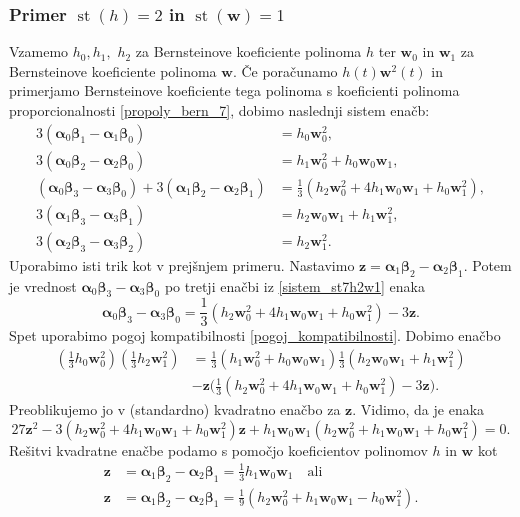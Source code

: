 \documentclass[12pt,a4paper,twoside]{article}
\theoremstyle{definition} %
\theoremstyle{plain} %
\theoremstyle{primerstyle}
\numberwithin{equation}{section}  %
\newcommand{\wV}{\mathbf{w}}
\newcommand{\zV}{\mathbf{z}}
\newcommand{\balpha}{\boldsymbol \alpha}
\newcommand{\bbeta}{\boldsymbol \beta}
\DeclareMathOperator{\st}{st}
\begin{document}
\subsubsection{Primer \texorpdfstring{$\st(h)=2$}{st(h)=2} in \texorpdfstring{$\st(\wV)=1$}{st(w)=1}}
\label{klasifikacija_h2w1}

Vzamemo $h_0,h_1,$ $h_2$ za Bernsteinove koeficiente polinoma $h$ ter $\wV_0$ in $\wV_1$ za Bernsteinove koeficiente polinoma $\wV.$ Če poračunamo $h(t)\wV^2(t)$ in primerjamo Bernsteinove koeficiente tega polinoma s koeficienti polinoma proporcionalnosti \eqref{propoly_bern_7}, dobimo naslednji sistem enačb:
\begin{align}
	3(\balpha_0\bbeta_1-\balpha_1\bbeta_0)&=h_0\wV_0^2,\nonumber\\
	3(\balpha_0\bbeta_2-\balpha_2\bbeta_0)&=h_1\wV_0^2+h_0\wV_0\wV_1,\nonumber\\
	(\balpha_0\bbeta_3-\balpha_3\bbeta_0)+3(\balpha_1\bbeta_2-\balpha_2\bbeta_1)&=\frac{1}{3}(h_2\wV_0^2+4h_1\wV_0\wV_1+h_0\wV_1^2),\label{sistem_st7h2w1}\\
	3(\balpha_1\bbeta_3-\balpha_3\bbeta_1)&=h_2\wV_0\wV_1+h_1\wV_1^2,\nonumber\\
	3(\balpha_2\bbeta_3-\balpha_3\bbeta_2)&=h_2\wV_1^2.\nonumber
\end{align}
Uporabimo isti trik kot v prejšnjem primeru. Nastavimo $\zV=\balpha_1\bbeta_2-\balpha_2\bbeta_1.$ Potem je vrednost $\balpha_0\bbeta_3-\balpha_3\bbeta_0$ po tretji enačbi iz \eqref{sistem_st7h2w1} enaka $$\balpha_0\bbeta_3-\balpha_3\bbeta_0=\frac{1}{3}(h_2\wV_0^2+4h_1\wV_0\wV_1+h_0\wV_1^2)-3\zV.$$ Spet uporabimo pogoj kompatibilnosti \eqref{pogoj_kompatibilnosti}. Dobimo enačbo
\begin{align*}
	\left(\frac{1}{3}h_0\wV_0^2\right)\left(\frac{1}{3}h_2\wV_1^2\right)&=\frac{1}{3}(h_1\wV_0^2+h_0\wV_0\wV_1)\frac{1}{3}(h_2\wV_0\wV_1+h_1\wV_1^2)\nonumber\\
	&-\zV\Big(\frac{1}{3}(h_2\wV_0^2+4h_1\wV_0\wV_1+h_0\wV_1^2)-3\zV\Big).
\end{align*}
Preoblikujemo jo v (standardno) kvadratno enačbo za $\zV.$ Vidimo, da je enaka
\begin{equation*}
	27\zV^2-3(h_2\wV_0^2+4h_1\wV_0\wV_1+h_0\wV_1^2)\zV+h_1\wV_0\wV_1(h_2\wV_0^2+h_1\wV_0\wV_1+h_0\wV_1^2)=0.
\end{equation*}
Rešitvi kvadratne enačbe podamo s pomočjo koeficientov polinomov $h$ in $\wV$ kot
\begin{align}
	\zV&=\balpha_1\bbeta_2-\balpha_2\bbeta_1=\frac{1}{3}h_1\wV_0\wV_1\quad\text{ali}\nonumber\\
	\zV&=\balpha_1\bbeta_2-\balpha_2\bbeta_1=\frac{1}{9}(h_2\wV_0^2+h_1\wV_0\wV_1-h_0\wV_1^2).\label{st7h2w1}
\end{align}
\end{document}

